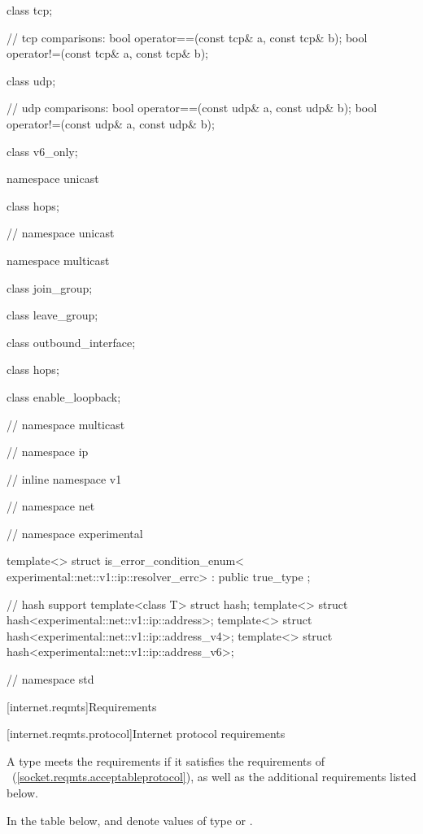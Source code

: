 \begin{codeblock}
{{{{{  class tcp;

  // tcp comparisons:
  bool operator==(const tcp& a, const tcp& b);
  bool operator!=(const tcp& a, const tcp& b);

  class udp;

  // udp comparisons:
  bool operator==(const udp& a, const udp& b);
  bool operator!=(const udp& a, const udp& b);

  class v6_only;

  namespace unicast {

    class hops;

  } // namespace unicast

  namespace multicast {

    class join_group;

    class leave_group;

    class outbound_interface;

    class hops;

    class enable_loopback;

  } // namespace multicast
} // namespace ip
} // inline namespace v1
} // namespace net
} // namespace experimental

  template<> struct is_error_condition_enum<
    experimental::net::v1::ip::resolver_errc>
      : public true_type {};

  // hash support
  template<class T> struct hash;
  template<> struct hash<experimental::net::v1::ip::address>;
  template<> struct hash<experimental::net::v1::ip::address_v4>;
  template<> struct hash<experimental::net::v1::ip::address_v6>;

} // namespace std
\end{codeblock}



[internet.reqmts]{Requirements}


%
%
[internet.reqmts.protocol]{Internet protocol requirements}

\pnum
A type  meets the  requirements if it satisfies the requirements of ~(\ref{socket.reqmts.acceptableprotocol}), as well as the additional requirements listed below.

\pnum
In the table below,
 and  denote values of type  or .

